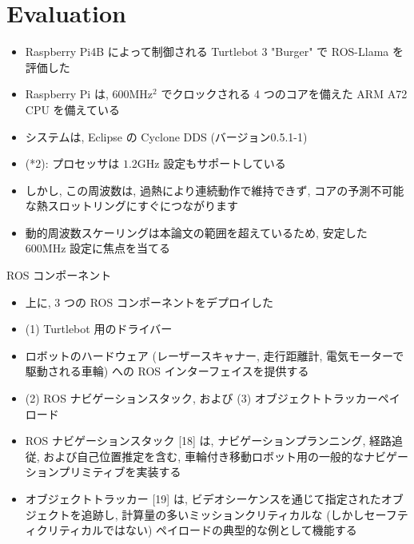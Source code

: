 
\section{Evaluation}
\label{sec: evaluation}

\begin{frame}{}
    \begin{itemize}
        \item Raspberry Pi4B によって制御される Turtlebot 3 "Burger" で ROS-Llama を評価した
\item Raspberry Pi は, $600 \mathrm{MHz}{ }^{2}$ でクロックされる 4 つのコアを備えた ARM A72 CPU を備えている
\item システムは, Eclipse の Cyclone DDS (バージョン0.5.1-1)
\item (*2): プロセッサは $1.2 \mathrm{GHz}$ 設定もサポートしている
\item しかし, この周波数は, 過熱により連続動作で維持できず, コアの予測不可能な熱スロットリングにすぐにつながります
\item 動的周波数スケーリングは本論文の範囲を超えているため, 安定した $600 \mathrm{MHz}$ 設定に焦点を当てる
    \end{itemize}
\end{frame}

\begin{frame}{ROS コンポーネント}
    \begin{itemize}
        \item 上に, 3 つの ROS コンポーネントをデプロイした
\item (1) Turtlebot 用のドライバー
\item ロボットのハードウェア (レーザースキャナー, 走行距離計, 電気モーターで駆動される車輪) への ROS インターフェイスを提供する
\item (2) ROS ナビゲーションスタック, および (3) オブジェクトトラッカーペイロード
    \end{itemize}
\end{frame}

\begin{frame}{}
    \begin{itemize}
        \item ROS ナビゲーションスタック [18] は, ナビゲーションプランニング, 経路追従, および自己位置推定を含む, 車輪付き移動ロボット用の一般的なナビゲーションプリミティブを実装する
\item オブジェクトトラッカー [19] は, ビデオシーケンスを通じて指定されたオブジェクトを追跡し, 計算量の多いミッションクリティカルな (しかしセーフティクリティカルではない) ペイロードの典型的な例として機能する
    \end{itemize}
\end{frame}

